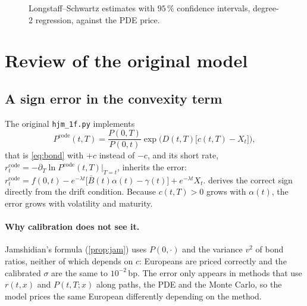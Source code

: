 \documentclass[11pt,a4paper]{article}
\theoremstyle{definition}
\theoremstyle{remark}
\newcommand{\Bb}{\bar B}
\begin{document}
\begin{figure}[ht]\centering
{}
\caption{Longstaff--Schwartz estimates with $95\,\%$ confidence intervals, degree-2 regression, against the PDE price.}\label{fig:lsmc}
\end{figure}

\section{Review of the original model}\label{sec:review}
\subsection{A sign error in the convexity term}
The original \texttt{hjm\_1f.py} implements
\begin{equation}
  P^{\mathrm{code}}(t,T)=\frac{P(0,T)}{P(0,t)}\exp\Big(D(t,T)\big[c(t,T)-X_t\big]\Big),
\end{equation}
that is \eqref{eq:bond} with $+c$ instead of $-c$, and its short rate, $r^{\mathrm{code}}_t=-\partial_T\ln P^{\mathrm{code}}(t,T)|_{T=t}$,
inherits the error: $r^{\mathrm{code}}_t=f(0,t)-e^{-\lambda t}\big[\Bb(t)\alpha(t)-\gamma(t)\big]+e^{-\lambda t}X_t$.
 derives the correct sign directly from the drift condition. Because $c(t,T)>0$ grows with
$\alpha(t)$, the error grows with volatility and maturity.

\paragraph{Why calibration does not see it.} Jamshidian's formula (\cref{prop:jam}) uses $P(0,\cdot)$ and the variance
$v^2$ of bond ratios, neither of which depends on $c$: Europeans are priced correctly and the calibrated $\sigma$ are the
same to $10^{-2}$\,bp. The error only appears in methods that use $r(t,x)$ and $P(t,T;x)$ along paths, the PDE and the Monte
Carlo, so the model prices the same European differently depending on the method.
\end{document}
